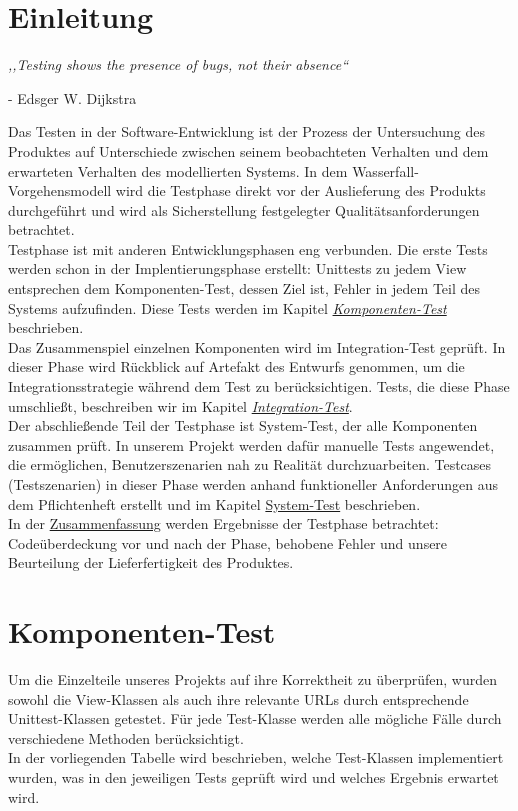 \documentclass[parskip=full,11pt]{scrartcl}
\begin{document}
 \section{Einleitung}
\begin{center}
\textit{,,Testing shows the presence of bugs, not their absence``}
\end{center}
\begin{flushright}
- Edsger W. Dijkstra\\
\end{flushright}
Das Testen in der Software-Entwicklung ist der Prozess der Untersuchung des Produktes auf Unterschiede zwischen seinem beobachteten Verhalten und dem erwarteten Verhalten des modellierten Systems.
In dem Wasserfall-Vorgehensmodell wird die Testphase direkt vor der Auslieferung des Produkts durchgeführt und wird als Sicherstellung festgelegter Qualitätsanforderungen betrachtet.\\
Testphase ist mit anderen Entwicklungsphasen eng verbunden. Die erste Tests werden schon in der Implentierungsphase erstellt: Unittests zu jedem View entsprechen dem Komponenten-Test, dessen Ziel ist, Fehler in jedem Teil des Systems aufzufinden. Diese Tests werden im Kapitel \hyperref[komponententest]{\textit{Komponenten-Test}} beschrieben.\\
Das Zusammenspiel einzelnen Komponenten wird im Integration-Test geprüft. In dieser Phase wird Rückblick auf Artefakt des Entwurfs genommen, um die Integrationsstrategie während dem Test zu berücksichtigen. Tests, die diese Phase umschließt, beschreiben wir im Kapitel \hyperref[integrationtest]{\textit{Integration-Test}}.\\
Der abschließende Teil der Testphase ist System-Test, der alle Komponenten zusammen prüft. In unserem Projekt werden dafür manuelle Tests angewendet, die ermöglichen, Benutzerszenarien nah zu Realität durchzuarbeiten. Testcases (Testszenarien) in dieser Phase werden anhand funktioneller Anforderungen aus dem Pflichtenheft erstellt und im Kapitel \hyperref[systemtest]{System-Test} beschrieben.\\
In der \hyperref[zusammenfassung]{Zusammenfassung} werden Ergebnisse der Testphase betrachtet: Codeüberdeckung vor und nach der Phase, behobene Fehler und unsere Beurteilung der Lieferfertigkeit des Produktes.
 \newpage
\section{Komponenten-Test} \label{komponententest}
Um die Einzelteile unseres Projekts auf ihre Korrektheit zu überprüfen, wurden sowohl die View-Klassen als auch ihre relevante URLs durch entsprechende Unittest-Klassen getestet. Für jede Test-Klasse werden alle mögliche Fälle durch verschiedene Methoden berücksichtigt.\\
In der vorliegenden Tabelle wird beschrieben, welche Test-Klassen implementiert wurden, was in den jeweiligen Tests geprüft wird und welches Ergebnis erwartet wird.
\end{document}
